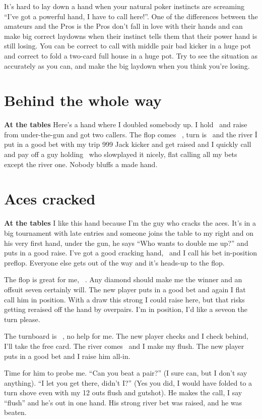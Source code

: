 It's hard to lay down a hand when your natural poker instincts are
screaming ``I've got a powerful hand, I have to call here!''. One of
the differences between the amateurs and the Pros is the Pros don't
fall in love with their hands and can make big correct laydowns when
their instinct tells them that their power hand is still losing.
You can be correct to call with middle pair bad kicker in a huge pot
and correct to fold a two-card full house in a huge pot. Try to see
the situation as accurately as you can, and make the big laydown when
you think you're losing.

\section{Behind the whole way}

\textbf{At the tables} Here's a hand where I doubled somebody up. I
hold \Jd\nined\ and raise from under-the-gun and got two callers. The
flop comes \Qd\ninec\fiveh\ , turn is \nines\ and the river \trec\. I
put in a good bet with my trip 999 Jack kicker and get raised and I
quickly call and pay off a guy holding \Qc\Qs\ who slowplayed it
nicely, flat calling all my bets except the river one. Nobody bluffs a
made hand.

\section{Aces cracked}

\textbf{At the tables} I like this hand because I'm the guy who cracks
the aces. It's in a big tournament with late entries and someone joins
the table to my right and on his very first hand, under the gun,  he
says ``Who wants to double me up?'' and puts in a good raise. I've got
a good cracking hand, \nined\eigd\ and I call his bet in-position
preflop. Everyone else gets out of the way and it's heads-up to the
flop.


The flop is great for me, \tend\sixc\tred\ . Any diamond should make me
the winner and an offsuit seven certainly will. The new player puts in
a good bet and again I flat call him in position. With a draw this
strong I could raise here, but that risks getting reraised off the hand
by overpairs. I'm in position, I'd like a seveon the turn please.

The turnboard is \tend\sixc\tred\Qc\ , no help for me. The new
player checks and I check behind, I'll take the free card. The river
comes \twod\ and I make my flush. The new player puts in a good bet
and I raise him all-in.

Time for him to probe me. ``Can you beat a pair?'' (I sure can, but I
don't say anything). ``I let you get there, didn't I?'' (Yes you did,
I would have folded to a turn shove even with my 12 outs flush and
gutshot). He makes the call, I say ``flush'' and he's out in one hand.
His strong river bet was raised, and he was beaten.

